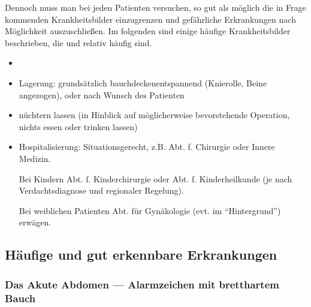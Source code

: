 Dennoch muss man bei jeden Patienten versuchen, so gut als
möglich die in Frage kommenden Krankheitsbilder einzugrenzen
und gefährliche Erkrankungen nach Möglichkeit auszuschließen. Im
folgenden sind einige häufige Krankheitsbilder beschrieben,
die   und relativ häufig sind.

{\label{m:am-abdominalerkrankungen}}{
\begin{itemize}
  \item {} \TxBeiVit
  \TxMassVit
  \item Lagerung: grundsätzlich bauchdeckenentspannend
  (Knierolle, Beine angezogen), oder nach Wunsch des Patienten
  \item nüchtern lassen (in Hinblick auf möglicherweise bevorstehende
  Operation, nichts essen oder trinken lassen)
  \item Hospitalisierung: Situationsgerecht, z.B. Abt. f. Chirurgie oder
  Innere Medizin.
  
  Bei Kindern Abt. f. Kinderchirurgie oder Abt. f. Kinderheilkunde (je nach
  Verdachtsdiagnose und regionaler Regelung).
  
  Bei weiblichen Patienten Abt. für Gynäkologie (evt. im "`Hintergrund"') erwägen.
\end{itemize}
}


\subsection{Häufige und gut erkennbare Erkrankungen}



\subsubsection{Das Akute Abdomen --- Alarmzeichen mit
bretthartem Bauch}\label{topic:akutes-abdomen}






